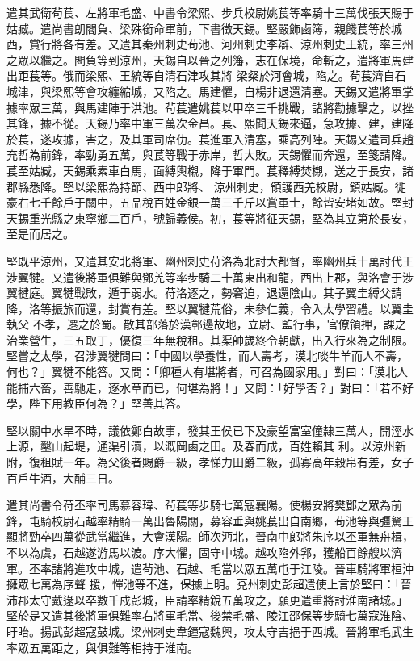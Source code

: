 \begin{pinyinscope}
 遣其武衛茍萇、左將軍毛盛、中書令梁熙、步兵校尉姚萇等率騎十三萬伐張天賜于姑臧。遣尚書朗閻負、梁殊銜命軍前，下書徵天錫。堅嚴飾鹵簿，親餞萇等於城西，賞行將各有差。又遣其秦州刺史茍池、河州刺史李辯、涼州刺史王統，率三州之眾以繼之。閻負等到涼州，天錫自以晉之列籓，志在保境，命斬之，遣將軍馬建出距萇等。俄而梁熙、王統等自清石津攻其將
 梁粲於河會城，陷之。茍萇濟自石城津，與梁熙等會攻纏縮城，又陷之。馬建懼，自楊非退還清塞。天錫又遣將軍掌據率眾三萬，與馬建陣于洪池。茍萇遣姚萇以甲卒三千挑戰，諸將勸據擊之，以挫其鋒，據不從。天錫乃率中軍三萬次金昌。萇、熙聞天錫來逼，急攻據、建，建降於萇，遂攻據，害之，及其軍司席仂。萇進軍入清塞，乘高列陣。天錫又遣司兵趙充哲為前鋒，率勁勇五萬，與萇等戰于赤岸，哲大敗。天錫懼而奔還，至箋請降。萇至姑臧，天錫乘素車白馬，面縛輿櫬，降于軍門。萇釋縛焚櫬，送之于長安，諸郡縣悉降。堅以梁熙為持節、西中郎將、
 涼州刺史，領護西羌校尉，鎮姑臧。徙豪右七千餘戶于關中，五品稅百姓金銀一萬三千斤以賞軍士，餘皆安堵如故。堅封天錫重光縣之東寧鄉二百戶，號歸義侯。初，萇等將征天錫，堅為其立第於長安，至是而居之。



 堅既平涼州，又遣其安北將軍、幽州刺史苻洛為北討大都督，率幽州兵十萬討代王涉翼犍。又遣後將軍俱難與鄧羌等率步騎二十萬東出和龍，西出上郡，與洛會于涉翼犍庭。翼犍戰敗，遁于弱水。苻洛逐之，勢窘迫，退還陰山。其子翼圭縛父請降，洛等振旅而還，封賞有差。堅以翼犍荒俗，未參仁義，令入太學習禮。以翼圭執父
 不孝，遷之於蜀。散其部落於漢鄣邊故地，立尉、監行事，官僚領押，課之治業營生，三五取丁，優復三年無稅租。其渠帥歲終令朝獻，出入行來為之制限。堅嘗之太學，召涉翼犍問曰：「中國以學養性，而人壽考，漠北啖牛羊而人不壽，何也？」翼犍不能答。又問：「卿種人有堪將者，可召為國家用。」對曰：「漠北人能捕六畜，善馳走，逐水草而已，何堪為將！」又問：「好學否？」對曰：「若不好學，陛下用教臣何為？」堅善其答。



 堅以關中水旱不時，議依鄭白故事，發其王侯已下及豪望富室僮隸三萬人，開涇水上源，鑿山起堤，通渠引瀆，以溉岡鹵之田。及春而成，百姓賴其
 利。以涼州新附，復租賦一年。為父後者賜爵一級，孝悌力田爵二級，孤寡高年穀帛有差，女子百戶牛酒，大酺三日。



 遣其尚書令苻丕率司馬慕容瑋、茍萇等步騎七萬寇襄陽。使楊安將樊鄧之眾為前鋒，屯騎校尉石越率精騎一萬出魯陽關，募容垂與姚萇出自南鄉，茍池等與彊駑王顯將勁卒四萬從武當繼進，大會漢陽。師次沔北，晉南中郎將朱序以丕軍無舟楫，不以為虞，石越遂游馬以渡。序大懼，固守中城。越攻陷外郛，獲船百餘艘以濟軍。丕率諸將進攻中城，遣茍池、石越、毛當以眾五萬屯于江陵。晉車騎將軍桓沖擁眾七萬為序聲
 援，憚池等不進，保據上明。兗州刺史彭超遣使上言於堅曰：「晉沛郡太守戴逯以卒數千戍彭城，臣請率精銳五萬攻之，願更遣重將討淮南諸城。」堅於是又遣其後將軍俱難率右將軍毛當、後禁毛盛、陵江邵保等步騎七萬寇淮陰、盱眙。揚武彭超寇鼓城。梁州刺史韋鐘寇魏興，攻太守吉挹于西城。晉將軍毛武生率眾五萬距之，與俱難等相持于淮南。




\end{pinyinscope}
